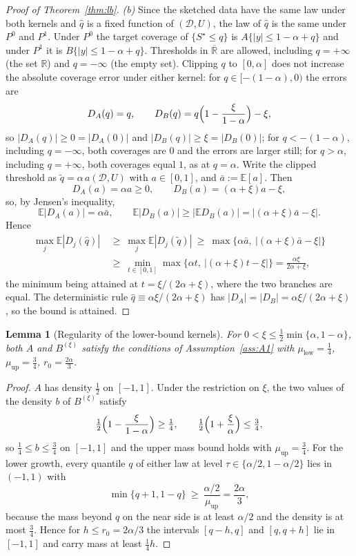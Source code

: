 \documentclass[11pt,a4paper]{article}
\newcommand{\abs}[1]{\left|#1\right|}
\newcommand{\E}{\mathbb{E}}
\newcommand{\R}{\mathbb{R}}
\newcommand{\Rbar}{\overline{\mathbb{R}}}
\theoremstyle{plain}
\newtheorem{lemma}[theorem]{Lemma}
\theoremstyle{definition}
\theoremstyle{remark}
\begin{document}
\begin{proof}[Proof of Theorem~\ref{thm:lb}]
\emph{(b)} Since the sketched data have the same law under both kernels and $\widehat q$ is a fixed function of $(\mathcal D,U)$, the law of $\widehat q$ is the same under $P^0$ and $P^1$. Under $P^0$ the target coverage of $\{S^\star\le q\}$ is $A\{|y|\le1-\alpha+q\}$ and under $P^1$ it is $B\{|y|\le1-\alpha+q\}$. Thresholds in $\Rbar$ are allowed, including $q=+\infty$ (the set $\R$) and $q=-\infty$ (the empty set). Clipping $q$ to $[0,\alpha]$ does not increase the absolute coverage error under either kernel: for $q\in[-(1-\alpha),0)$ the errors are
\[
D_A(q)=q,\qquad D_B(q)=q\Bigl(1-\frac{\xi}{1-\alpha}\Bigr)-\xi,
\]
so $|D_A(q)|\ge0=|D_A(0)|$ and $|D_B(q)|\ge\xi=|D_B(0)|$; for $q<-(1-\alpha)$, including $q=-\infty$, both coverages are $0$ and the errors are larger still; for $q>\alpha$, including $q=+\infty$, both coverages equal $1$, as at $q=\alpha$. Write the clipped threshold as $\widetilde q=\alpha\,a(\mathcal D,U)$ with $a\in[0,1]$, and $\bar a:=\E[a]$. Then
\[
D_A(a)=\alpha a\ge0,\qquad D_B(a)=(\alpha+\xi)a-\xi ,
\]
so, by Jensen's inequality,
\[
\E|D_A(a)|=\alpha\bar a,\qquad \E|D_B(a)|\ge|\E D_B(a)|=|(\alpha+\xi)\bar a-\xi| .
\]
Hence
\begin{align*}
\max_j\E\abs{D_j(\widehat q)}\ &\ge\ \max_j\E\abs{D_j(\widetilde q)}\ \ge\ \max\bigl\{\alpha\bar a,\ \abs{(\alpha+\xi)\bar a-\xi}\bigr\}\\
&\ge\ \min_{t\in[0,1]}\max\bigl\{\alpha t,\ \abs{(\alpha+\xi)t-\xi}\bigr\}=\frac{\alpha\xi}{2\alpha+\xi},
\end{align*}
the minimum being attained at $t=\xi/(2\alpha+\xi)$, where the two branches are equal. The deterministic rule $\widehat q\equiv\alpha\xi/(2\alpha+\xi)$ has $|D_A|=|D_B|=\alpha\xi/(2\alpha+\xi)$, so the bound is attained.
\end{proof}

\begin{lemma}[Regularity of the lower-bound kernels]\label{lem:A1check}
For $0<\xi\le\tfrac12\min\{\alpha,1-\alpha\}$, both $A$ and $B^{(\xi)}$ satisfy the conditions of Assumption~\ref{ass:A1} with $\mu_{\mathrm{low}}=\tfrac14$, $\mu_{\mathrm{up}}=\tfrac34$, $r_0=\tfrac{2\alpha}3$.
\end{lemma}
\begin{proof}
$A$ has density $\tfrac12$ on $[-1,1]$. Under the restriction on $\xi$, the two values of the density $b$ of $B^{(\xi)}$ satisfy
\[
\tfrac12\Bigl(1-\frac{\xi}{1-\alpha}\Bigr)\ge\tfrac14,\qquad \tfrac12\Bigl(1+\frac\xi\alpha\Bigr)\le\tfrac34,
\]
so $\tfrac14\le b\le\tfrac34$ on $[-1,1]$ and the upper mass bound holds with $\mu_{\mathrm{up}}=\tfrac34$. For the lower growth, every quantile $q$ of either law at level $\tau\in\{\alpha/2,1-\alpha/2\}$ lies in $(-1,1)$ with
\[
\min\{q+1,1-q\}\ \ge\ \frac{\alpha/2}{\mu_{\mathrm{up}}}=\frac{2\alpha}{3},
\]
because the mass beyond $q$ on the near side is at least $\alpha/2$ and the density is at most $\tfrac34$. Hence for $h\le r_0=2\alpha/3$ the intervals $[q-h,q]$ and $[q,q+h]$ lie in $[-1,1]$ and carry mass at least $\tfrac14h$.
\end{proof}
\end{document}

